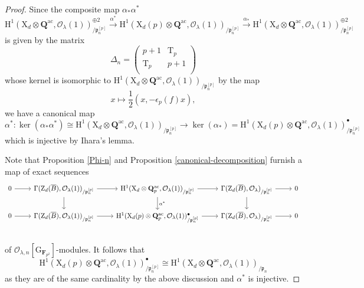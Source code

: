 \documentclass[10pt]{amsart}
\numberwithin{equation}{section}
\theoremstyle{plain}
\numberwithin{equation}{section}
\theoremstyle{definition}
\theoremstyle{remark}
\def\ac{\mathrm{ac}}
\def\Qbar{\QQ^{\ac}}
\def\ac{\mathrm{ac}}
\def\calO{\mathcal{O}}
\def\frakp{\mathfrak{p}}
\def\FF{\mathbf{F}}
\def\QQ{\mathbf{Q}}
\def\rmG{\mathrm{G}}
\def\rmH{\mathrm{H}}
\def\rmX{\mathrm{X}}
\def\rmT{\mathrm{T}}
\def\rmZ{\mathrm{Z}}
\begin{document}
\begin{proof}
Since the composite map $\alpha_{\ast}\alpha^{\ast}$
\begin{equation*}
\rmH^{1}({\rmX}_{d}\otimes{\Qbar}, \calO_{\lambda}(1))^{\oplus2}_{/\frakp^{[p]}_{n}}\xrightarrow{\alpha^{\ast}} \rmH^{1}(\rmX_{d}(p)\otimes{\Qbar}, \calO_{\lambda}(1))_{/\frakp^{[p]}_{n}}\xrightarrow{\alpha_{\ast}} \rmH^{1}({\rmX}_{d}\otimes{\Qbar}, \calO_{\lambda}(1))^{\oplus2}_{/\frakp^{[p]}_{n}}
\end{equation*}
is given by the matrix 
\begin{equation*}
\Delta_{n}=
\begin{pmatrix}
p+1 &   \rmT_{p}\\
\rmT_{p} & p+1\\ 
\end{pmatrix}
\end{equation*}
whose kernel is isomorphic to $\rmH^{1}({\rmX}_{d}\otimes{\Qbar}, \calO_{\lambda}(1))_{/\frakp^{[p]}_{n}}$ by the map 
\begin{equation}\label{1/2}
x\mapsto \frac{1}{2}(x, -\epsilon_{p}(f)x), 
\end{equation}
we have a canonical map 
\begin{equation*}
\alpha^{\ast}: \ker(\alpha_{\ast}\alpha^{\ast})\cong\rmH^{1}({\rmX}_{d}\otimes{\Qbar}, \calO_{\lambda}(1))_{/\frakp^{[p]}_{n}} \rightarrow \ker(\alpha_{\ast})=\rmH^{1}(\rmX_{d}(p)\otimes{\Qbar}, \calO_{\lambda}(1))^{\bullet}_{/\frakp^{[p]}_{n}} 
\end{equation*}
which is injective by Ihara's lemma. 

Note that Proposition \ref{Phi-n} and Proposition \ref{canonical-decomposition} furnish a map of exact sequences
\begin{equation*}
\begin{tikzcd}
0 \arrow[r] &\Gamma(\rmZ_{d}(\overline{B}), \calO_{\lambda}(1))_{/\frakp^{[p]}_{n}} \arrow[r] \arrow[d]      & \rmH^{1}({\rmX}_{d}\otimes{\QQ^{\ac}_{p}}, \calO_{\lambda}(1))_{/\frakp^{[p]}_{n}} \arrow[r] \arrow[d, "\alpha^{\ast}"] & \Gamma(\rmZ_{d}(\overline{B}), \calO_{\lambda})_{/\frakp^{[p]}_{n}} \arrow[d] \arrow[r] & 0\\
0 \arrow[r] &\Gamma(\rmZ_{d}(\overline{B}), \calO_{\lambda}(1))_{/\frakp^{[p]}_{n}} \arrow[r] &\rmH^{1}({\rmX}_{d}(p)\otimes {\QQ^{\ac}_{p}}, \calO_{\lambda}(1))^{\bullet}_{/\frakp^{[p]}_{n}}\arrow[r] & \Gamma(\rmZ_{d}(\overline{B}), \calO_{\lambda})_{/\frakp^{[p]}_{n}}\arrow[r] & 0\\  
\end{tikzcd}
\end{equation*}
of $\calO_{\lambda,n}[\rmG_{\FF_{p^{2}}}]$-modules. It follows that 
\begin{equation*}
\rmH^{1}(\rmX_{d}(p)\otimes{\Qbar}, \calO_{\lambda}(1))^{\bullet}_{/\frakp^{[p]}_{n}}\cong \rmH^{1}(\rmX_{d}\otimes{\Qbar}, \calO_{\lambda}(1))_{/\frakp_{n}}
\end{equation*}
as they are of the same cardinality by the above discussion and $\alpha^{\ast}$ is injective.
\end{proof}
\end{document}
